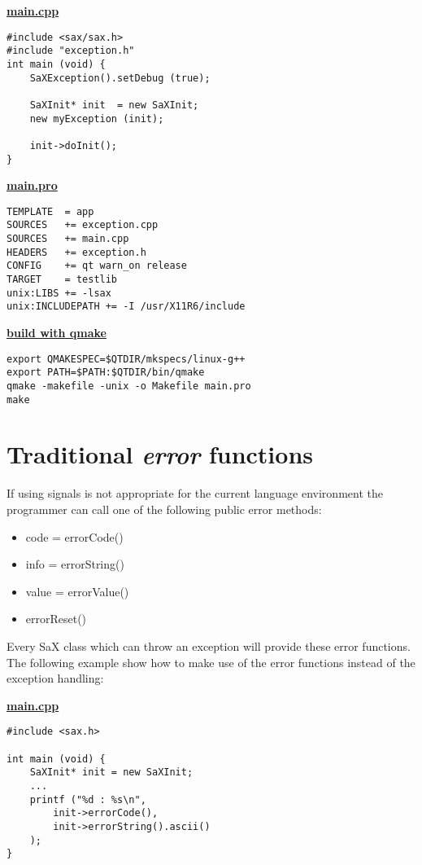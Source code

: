 \textbf{\underline{main.cpp}}

\begin{Command}{12cm}
\begin{small}
\begin{verbatim}
#include <sax/sax.h>
#include "exception.h"
int main (void) {
    SaXException().setDebug (true);

    SaXInit* init  = new SaXInit;
    new myException (init);

    init->doInit();
}
\end{verbatim}
\end{small}
\end{Command}

\textbf{\underline{main.pro}}

\begin{Command}{12cm}
\begin{small}
\begin{verbatim}
TEMPLATE  = app
SOURCES   += exception.cpp
SOURCES   += main.cpp
HEADERS   += exception.h
CONFIG    += qt warn_on release
TARGET    = testlib
unix:LIBS += -lsax
unix:INCLUDEPATH += -I /usr/X11R6/include
\end{verbatim}
\end{small}
\end{Command}

\textbf{\underline{build with qmake}}

\begin{Command}{12cm}
\begin{small}
\begin{verbatim}
export QMAKESPEC=$QTDIR/mkspecs/linux-g++
export PATH=$PATH:$QTDIR/bin/qmake
qmake -makefile -unix -o Makefile main.pro
make
\end{verbatim}
\end{small}
\end{Command}

\newpage

\section{Traditional \textit{error} functions}
If using signals is not appropriate for the current language environment
the programmer can call one of the following public error methods:
\begin{itemize}
\item code = errorCode()
\item info = errorString()
\item value = errorValue()
\item errorReset()
\end{itemize}
Every SaX class which can throw an exception will provide these
error functions. The following example show how to make use of the error
functions instead of the exception handling:

\textbf{\underline{main.cpp}}

\begin{Command}{12cm}
\begin{small}
\begin{verbatim}
#include <sax.h>

int main (void) {
    SaXInit* init = new SaXInit;
    ...
    printf ("%d : %s\n",
        init->errorCode(),
        init->errorString().ascii()
    );
}
\end{verbatim}
\end{small}
\end{Command}
